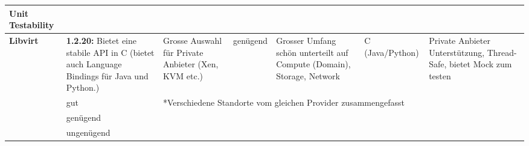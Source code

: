 \begin{landscape}
\begin{table}[h]
\begin{tabularx}{\linewidth}{|l|X|X|l|X|l|X|}
Unit Testability
\\
\hline
\textbf{Libvirt}	
&
\cellcolor{green!25}
\textbf{1.2.20:}  Bietet eine stabile API in C 
(bietet auch Language Bindings für Java und Python.)
&
\cellcolor{green!25}
Grosse Auswahl für Private Anbieter (Xen, KVM etc.)
&
 \cellcolor{yellow!25}	
genügend
&
\cellcolor{green!25}
Grosser Umfang schön unterteilt auf Compute (Domain), Storage, Network
&
\cellcolor{green!25}
C (Java/Python)
&
\cellcolor{green!25}
Private Anbieter Unterstützung, Thread-Safe, 
bietet Mock zum testen
\\
\hline
\cellcolor{green!25}
& 
gut
&
\multicolumn{5}{l|}{*Verschiedene Standorte vom gleichen Provider zusammengefasst}
\\
 \cellcolor{yellow!25}	
 &
 \multicolumn{6}{l}{genügend}
 \\
 \cellcolor{red!50}
 &
 \multicolumn{6}{l}{ungenügend}
 \\
   
  \end{tabularx}
  \end{table}
\end{landscape}
\restoregeometry
